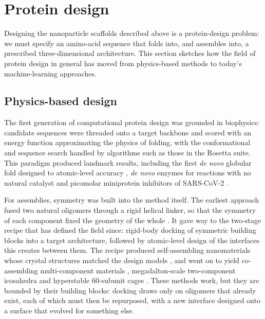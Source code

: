 \section{Protein design}
\label{sec:protein-design}

Designing the nanoparticle scaffolds described above is a protein-design problem: we must
specify an amino-acid sequence that folds into, and assembles into, 
a prescribed three-dimensional architecture. This section sketches how the field 
of protein design in general has moved from
physics-based methods to today's machine-learning approaches.

\subsection{Physics-based design}
\label{subsec:physics-design}

The first generation of computational protein design was grounded in biophysics:
candidate sequences were threaded onto a target backbone and scored with an
energy function approximating the physics of folding, with the conformational and
sequence search handled by algorithms such as those in the Rosetta suite. This
paradigm produced landmark results, including the first \emph{de novo} globular fold
designed to atomic-level accuracy \parencite{kuhlmanDesignNovelGlobular2003a}, \emph{de novo} enzymes
for reactions with no natural catalyst
\parencite{rothlisberger_kemp_2008,siegel_computational_2010} and picomolar
miniprotein inhibitors of SARS-CoV-2 \parencite{cao_novo_2020}.

For assemblies, symmetry was built into the method itself. The earliest approach
fused two natural oligomers through a rigid helical linker, so that the symmetry
of each component fixed the geometry of the whole
\parencite{padilla_nanohedra_2001}. It gave way to the two-stage recipe that has
defined the field since: rigid-body docking of symmetric building blocks into a
target architecture, followed by atomic-level design of the interfaces this
creates between them. The recipe produced self-assembling nanomaterials whose
crystal structures matched the design models
\parencite{king_computational_2012}, and went on to yield co-assembling
multi-component materials \parencite{king_accurate_2014}, megadalton-scale
two-component icosahedra \parencite{bale_accurate_2016} and hyperstable
60-subunit cages \parencite{hsia_design_2016}. These methods work, but they are bounded by 
their building blocks: docking draws only on oligomers that already exist,
each of which must then be repurposed, with a new interface designed onto a 
surface that evolved for something else. 

